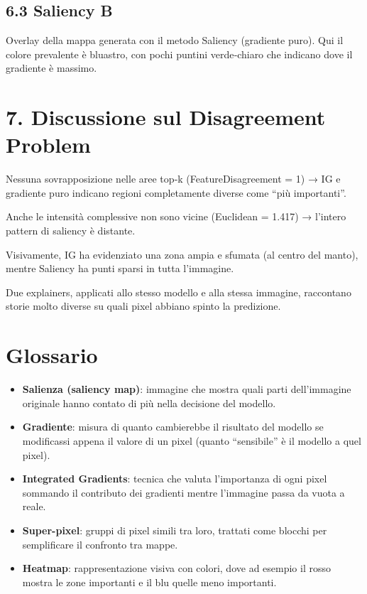 \documentclass[a4paper,11pt]{article}
\begin{document}
\subsection*{6.3 Saliency B}
Overlay della mappa generata con il metodo Saliency (gradiente puro). Qui il colore prevalente è bluastro, con pochi puntini verde‐chiaro che indicano dove il gradiente è massimo.

\section*{7. Discussione sul Disagreement Problem}
Nessuna sovrapposizione nelle aree top‐k (FeatureDisagreement = 1) → IG e gradiente puro indicano regioni completamente diverse come “più importanti”.

Anche le intensità complessive non sono vicine (Euclidean = 1.417) → l’intero pattern di saliency è distante.

Visivamente, IG ha evidenziato una zona ampia e sfumata (al centro del manto), mentre Saliency ha punti sparsi in tutta l’immagine.

Due explainers, applicati allo stesso modello e alla stessa immagine, raccontano storie molto diverse su quali pixel abbiano spinto la predizione.

\section*{Glossario}

\begin{itemize}
  \item \textbf{Salienza (saliency map)}: immagine che mostra quali parti dell’immagine originale hanno contato di più nella decisione del modello.
  \item \textbf{Gradiente}: misura di quanto cambierebbe il risultato del modello se modificassi appena il valore di un pixel (quanto “sensibile” è il modello a quel pixel).
  \item \textbf{Integrated Gradients}: tecnica che valuta l’importanza di ogni pixel sommando il contributo dei gradienti mentre l’immagine passa da vuota a reale.
  \item \textbf{Super-pixel}: gruppi di pixel simili tra loro, trattati come blocchi per semplificare il confronto tra mappe.
  \item \textbf{Heatmap}: rappresentazione visiva con colori, dove ad esempio il rosso mostra le zone importanti e il blu quelle meno importanti.
\end{itemize}
\end{document}
